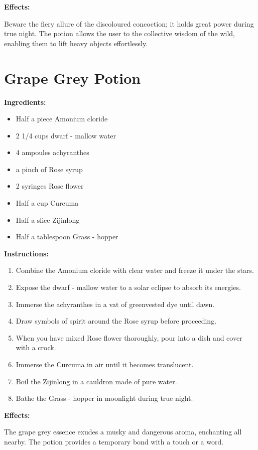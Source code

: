 \documentclass{article}
\begin{document}
\textbf{Effects:}

Beware the fiery allure of the discoloured concoction; it holds great power during true night. The potion allows the user to the collective wisdom of the wild, enabling them to lift heavy objects effortlessly.

\newpage
\section*{Grape Grey Potion}

\textbf{Ingredients:}

\begin{itemize}
  \item Half a piece Amonium cloride
  \item 2 1/4 cups dwarf - mallow water
  \item 4 ampoules achyranthes
  \item a pinch of Rose syrup
  \item 2 syringes Rose flower
  \item Half a cup Curcuma
  \item Half a slice Zijinlong
  \item Half a tablespoon Grass - hopper
\end{itemize}

\textbf{Instructions:}

\begin{enumerate}
  \item Combine the Amonium cloride with clear water and freeze it under the stars.
  \item Expose the dwarf - mallow water to a solar eclipse to absorb its energies.
  \item Immerse the achyranthes in a vat of greenvested dye until dawn.
  \item Draw symbols of spirit around the Rose syrup before proceeding.
  \item When you have mixed Rose flower thoroughly, pour into a dish and cover with a crock.
  \item Immerse the Curcuma in air until it becomes translucent.
  \item Boil the Zijinlong in a cauldron made of pure water.
  \item Bathe the Grass - hopper in moonlight during true night.
\end{enumerate}

\textbf{Effects:}

The grape grey essence exudes a musky and dangerous aroma, enchanting all nearby. The potion provides a temporary bond with a touch or a word.
\end{document}

